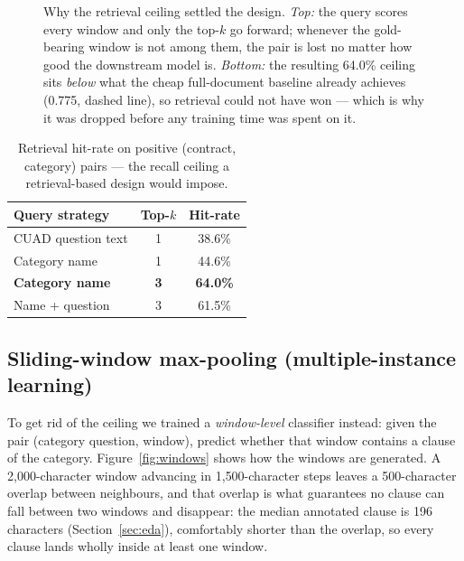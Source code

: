 \begin{figure}[ht]
\caption{Why the retrieval ceiling settled the design. \emph{Top:} the query scores every window and only the top-$k$ go forward; whenever the gold-bearing window is not among them, the pair is lost no matter how good the downstream model is. \emph{Bottom:} the resulting 64.0\% ceiling sits \emph{below} what the cheap full-document baseline already achieves (0.775, dashed line), so retrieval could not have won --- which is why it was dropped before any training time was spent on it.}
\label{fig:ceiling}
\end{figure}

\begin{table}[ht]
\centering
\caption{Retrieval hit-rate on positive (contract, category) pairs --- the recall ceiling a retrieval-based design would impose.}
\label{tab:retrieval}
\begin{tabular}{lcc}
\toprule
\textbf{Query strategy} & \textbf{Top-$k$} & \textbf{Hit-rate}\\
\midrule
CUAD question text        & 1 & 38.6\%\\
Category name             & 1 & 44.6\%\\
\textbf{Category name}    & \textbf{3} & \textbf{64.0\%}\\
Name + question           & 3 & 61.5\%\\
\bottomrule
\end{tabular}
\end{table}

\subsection{Sliding-window max-pooling (multiple-instance learning)}
\label{sec:mil}
To get rid of the ceiling we trained a \emph{window-level} classifier instead: given the pair (category question, window), predict whether that window contains a clause of the category. Figure~\ref{fig:windows} shows how the windows are generated. A 2{,}000-character window advancing in 1{,}500-character steps leaves a 500-character overlap between neighbours, and that overlap is what guarantees no clause can fall between two windows and disappear: the median annotated clause is 196 characters (Section~\ref{sec:eda}), comfortably shorter than the overlap, so every clause lands wholly inside at least one window.

